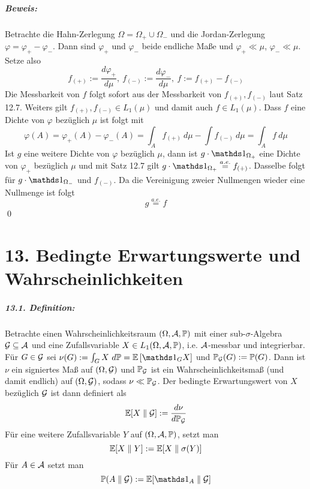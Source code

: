 \documentclass[11pt]{report}
\begin{document}
     \paragraph{Beweis:}Betrachte die Hahn-Zerlegung $\Omega=\Omega_+\cup\Omega_-$ und die Jordan-Zerlegung $\varphi=\varphi_+-\varphi_-$. Dann sind $\varphi_+$ und $\varphi_-$ beide endliche Maße und $\varphi_+\ll\mu$, $\varphi_-\ll\mu$. Setze also 
     $$f_{(+)}:=\dfrac{d\varphi_+}{d\mu},\ f_{(-)}:=\dfrac{d\varphi_-}{d\mu},\ f:=f_{(+)}-f_{(-)}$$
     Die Messbarkeit von $f$ folgt sofort aus der Messbarkeit von $f_{(+)},f_{(-)}$ laut Satz 12.7. Weiters gilt $f_{(+)},f_{(-)}\in L_1(\mu)$ und damit auch $f\in L_1(\mu)$. Dass $f$ eine Dichte von $\varphi$ bezüglich $\mu$ ist folgt mit
     $$\varphi(A)=\varphi_+(A)-\varphi_-(A)=\int_A f_{(+)}\ d\mu-\int f_{(-)}\ d\mu=\int_A f\ d\mu$$
     Ist $g$ eine weitere Dichte von $\varphi$ bezüglich $\mu$, dann ist $g\cdot\ind{\Omega_+}$ eine Dichte von $\varphi_+$ bezüglich $\mu$ und mit Satz 12.7 gilt $g\cdot\ind{\Omega_+}\overset{a.e.}{=}f_{(+)}$. Dasselbe folgt für $g\cdot\ind{\Omega_-}$ und $f_{(-)}$. Da die Vereinigung zweier Nullmengen wieder eine Nullmenge ist folgt
     $$g\overset{a.e.}{=}f$$
     \qed
     
     \chapter*{13. Bedingte Erwartungswerte und Wahrscheinlichkeiten}
     \paragraph{13.1. Definition:} Betrachte einen Wahrscheinlichkeitsraum $(\Omega, \mathcal{A}, \mathbb{P})$ mit einer sub-$\sigma$-Algebra $\mathcal{G}\subseteq\mathcal{A}$ und eine Zufallsvariable $X\in L_1(\Omega, \mathcal{A}, \mathbb{P})$, i.e. $\mathcal{A}$-messbar und integrierbar. F\"ur $G\in\mathcal{G}$ sei $\nu(G):=\int_G X\ d\Pp=\E\left[\ind{G}X\right]$ und $\mathbb{P}_{\mathcal{G}}(G):=\mathbb{P}(G)$. Dann ist $\nu$ ein signiertes Ma\ss{} auf $(\Omega,\mathcal{G})$ und $\mathbb{P}_{\mathcal{G}}$ ist ein Wahrscheinlichkeitsma\ss{} (und damit endlich) auf $(\Omega,\mathcal{G})$, sodass $\nu\ll\mathbb{P}_{\mathcal{G}}$. \newline
     Der bedingte Erwartungswert von $X$ bez\"uglich $\mathcal{G}$ ist dann definiert als
     $$\mathbb{E}[X\parallel \mathcal{G}]:=\dfrac{d\nu}{d\mathbb{P}_{\mathcal{G}}}$$
     F\"ur eine weitere Zufallsvariable $Y$ auf $(\Omega, \mathcal{A}, \mathbb{P})$, setzt man 
     $$\mathbb{E}[X\parallel Y]:=\mathbb{E}[X\parallel\sigma(Y)]$$
     F\"ur $A\in\mathcal{A}$ setzt man
     $$\Pp(A\parallel\G):=\E[\ind{A}\parallel\G]$$
     
\end{document}
